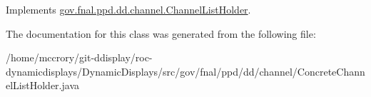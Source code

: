 Implements \hyperlink{interfacegov_1_1fnal_1_1ppd_1_1dd_1_1channel_1_1ChannelListHolder_a9e2d59130d1583a9eaa93840ba1c4004}{gov.\-fnal.\-ppd.\-dd.\-channel.\-Channel\-List\-Holder}.



The documentation for this class was generated from the following file\-:\begin{DoxyCompactItemize}
\item 
/home/mccrory/git-\/ddisplay/roc-\/dynamicdisplays/\-Dynamic\-Displays/src/gov/fnal/ppd/dd/channel/Concrete\-Channel\-List\-Holder.\-java\end{DoxyCompactItemize}
